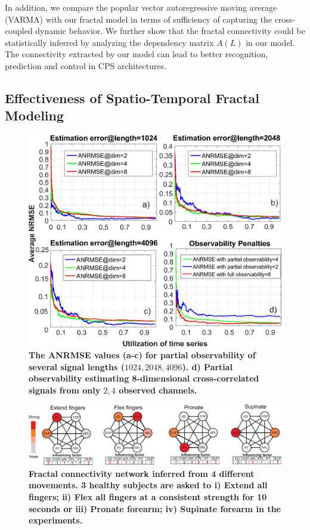 In addition, we compare the popular vector autoregressive moving average (VARMA) with our fractal model in terms of sufficiency of capturing the cross-coupled dynamic behavior. We further show that the fractal connectivity could be statistically inferred by analyzing the dependency matrix $A(L)$ in our model. The connectivity extracted by our model can lead to better recognition, prediction and control in CPS architectures.
\subsection{Effectiveness of Spatio-Temporal Fractal Modeling}
\begin{figure}%
\centering
\includegraphics[width=0.95\columnwidth]{effective_algorithm.eps}
\caption{\textbf{The ANRMSE values (a-c) for partial observability of several signal lengths ($1024, 2048, 4096$). d) Partial observability estimating 8-dimensional cross-correlated signals from only $2, 4$ observed channels.} }\label{fig:effective}
\end{figure} 
\begin{figure}%
\centering
\includegraphics[width=1\columnwidth]{movement.eps}
\caption{\textbf{Fractal connectivity network inferred from 4 different movements. 3 healthy subjects are asked to i) Extend all fingers; ii) Flex all fingers at a consistent strength for 10 seconds or iii) Pronate forearm; iv) Supinate forearm in the experiments. } }\label{fig:movement}
\end{figure}
